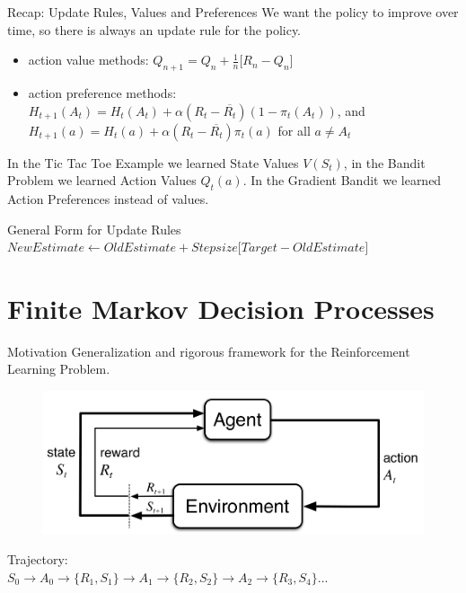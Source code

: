\documentclass{beamer}
\begin{document}
\begin{frame}{Recap: Update Rules, Values and Preferences}
We want the policy to improve over time, so there is always an update rule for the policy.
\begin{itemize}
\item action value methods: $ Q_{n+1} = Q_n + \frac{1}{n} \big[ R_n - Q_n \big] $
\item action preference methods: $ H_{t+1} (A_t) = H_t(A_t) + \alpha (R_t - \overline{R_t})(1 - \pi_t (A_t)) $, and $ H_{t+1} (a) = H_t(a) + \alpha (R_t - \overline{R_t})\pi_t (a) $ for all $a \ne A_t$
\end{itemize}

In the Tic Tac Toe Example we learned State Values $V(S_t)$, in the Bandit Problem we learned Action Values $Q_t (a)$. In the Gradient Bandit we learned Action Preferences instead of values.

	\begin{alertblock}{General Form for Update Rules}
		$NewEstimate \leftarrow OldEstimate + Stepsize \big[ Target - OldEstimate \big] $
	\end{alertblock}

\end{frame}


\section{Finite Markov Decision Processes}

\begin{frame}{Motivation}
Generalization and rigorous framework for the Reinforcement Learning Problem. \\

\begin{figure}
\centering
\includegraphics[width=0.9\linewidth]{Images/AgentEnvironment.png} \\
\end{figure}
Trajectory:\\
$S_0 \rightarrow A_0 \rightarrow \{ R_{1}, S_1 \} \rightarrow A_1 \rightarrow \{ R_{2}, S_2 \} \rightarrow A_2 \rightarrow \{ R_{3}, S_{4} \} ...$

\end{frame}
\end{document}
